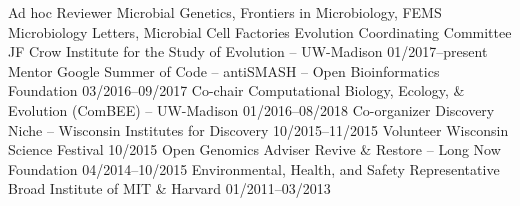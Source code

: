 

\begin{cvhonors}
  \cvhonor
    {Ad hoc Reviewer} %
    {Microbial Genetics, Frontiers in Microbiology, FEMS Microbiology Letters, Microbial Cell Factories} %
    {} %
  \cvhonor
    {Evolution Coordinating Committee} %
    {JF Crow Institute for the Study of Evolution -- UW-Madison} %
    {01/2017--present} %
  \cvhonor
    {Mentor} %
    {Google Summer of Code -- antiSMASH -- Open Bioinformatics Foundation} %
    {03/2016--09/2017} %
  \cvhonor
    {Co-chair} %
    {Computational Biology, Ecology, \& Evolution (ComBEE) -- UW-Madison} %
    {01/2016--08/2018} %
  \cvhonor
    {Co-organizer} %
    {Discovery Niche -- Wisconsin Institutes for Discovery} %
    {10/2015--11/2015} %
  \cvhonor
    {Volunteer} %
    {Wisconsin Science Festival} %
    {10/2015} %
  \cvhonor
    {Open Genomics Adviser} %
    {Revive \& Restore -- Long Now Foundation} %
    {04/2014--10/2015} %
  \cvhonor
    {Environmental, Health, and Safety Representative} %
    {Broad Institute of MIT \& Harvard} %
    {01/2011--03/2013} %
\end{cvhonors}